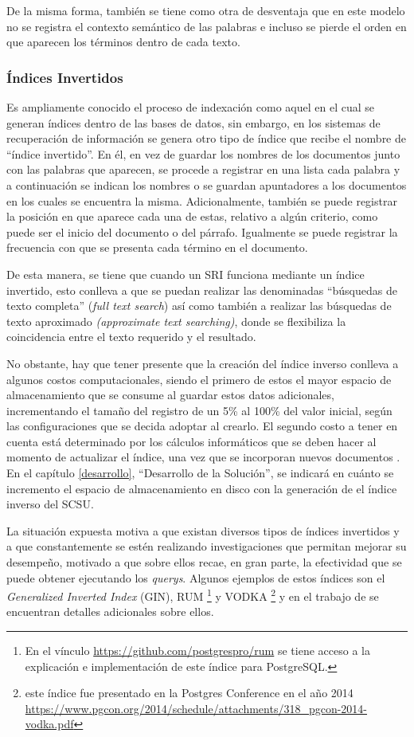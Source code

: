 \documentclass[
  12pt,
  openany]{book}
\begin{document}
De la misma forma, también se tiene como otra de desventaja que en este modelo no se registra el contexto semántico de las palabras e incluso se pierde el orden en que aparecen los términos dentro de cada texto.

\hypertarget{invind}{%
\subsubsection{Índices Invertidos}\label{invind}}

Es ampliamente conocido el proceso de indexación como aquel en el cual se generan índices dentro de las bases de datos, sin embargo, en los sistemas de recuperación de información se genera otro tipo de índice que recibe el nombre de ``índice invertido''. En él, en vez de guardar los nombres de los documentos junto con las palabras que aparecen, se procede a registrar en una lista cada palabra y a continuación se indican los nombres o se guardan apuntadores a los documentos en los cuales se encuentra la misma. Adicionalmente, también se puede registrar la posición en que aparece cada una de estas, relativo a algún criterio, como puede ser el inicio del documento o del párrafo. Igualmente se puede registrar la frecuencia con que se presenta cada término en el documento.

De esta manera, se tiene que cuando un SRI funciona mediante un índice invertido, esto conlleva a que se puedan realizar las denominadas ``búsquedas de texto completa'' (\emph{full text search}) así como también a realizar las búsquedas de texto aproximado \emph{(approximate text searching)}, donde se flexibiliza la coincidencia entre el texto requerido y el resultado.

No obstante, hay que tener presente que la creación del índice inverso conlleva a algunos costos computacionales, siendo el primero de estos el mayor espacio de almacenamiento que se consume al guardar estos datos adicionales, incrementando el tamaño del registro de un 5\% al 100\% del valor inicial, según las configuraciones que se decida adoptar al crearlo. El segundo costo a tener en cuenta está determinado por los cálculos informáticos que se deben hacer al momento de actualizar el índice, una vez que se incorporan nuevos documentos \citep{Mahapatra2011}. En el capítulo \ref{desarrollo}, ``Desarrollo de la Solución'', se indicará en cuánto se incremento el espacio de almacenamiento en disco con la generación de el índice inverso del SCSU.

La situación expuesta motiva a que existan diversos tipos de índices invertidos y a que constantemente se estén realizando investigaciones que permitan mejorar su desempeño, motivado a que sobre ellos recae, en gran parte, la efectividad que se puede obtener ejecutando los \emph{querys}. Algunos ejemplos de estos índices son el \emph{Generalized Inverted Index} (GIN), RUM \footnote{En el vínculo \url{https://github.com/postgrespro/rum} se tiene acceso a la explicación e implementación de este índice para PostgreSQL.} y VODKA \footnote{este índice fue presentado en la Postgres Conference en el año 2014 \url{https://www.pgcon.org/2014/schedule/attachments/318_pgcon-2014-vodka.pdf}} y en el trabajo de \citep{Mahapatra2011} se encuentran detalles adicionales sobre ellos.
\end{document}
